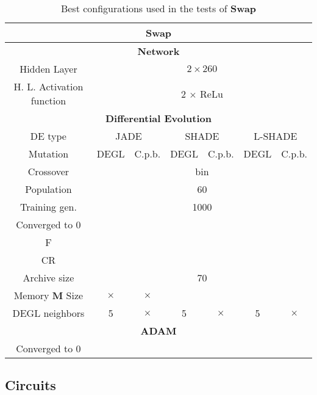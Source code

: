 \begin{table}[!h]
	\centering
	\begin{tabular}{|c|c|c|c|c|c|c|}
		\hline
		\multicolumn{7}{|c|}{\textbf{Swap}} \\ \hline \hline
		\multicolumn{7}{|c|}{\textbf{Network}} \\ \hline
		Hidden Layer & \multicolumn{6}{c|}{$2 \times 260$}\\ \hline
		H. L. Activation function & \multicolumn{6}{c|}{2 $\times$ ReLu}\\ \hline \hline
		\multicolumn{7}{|c|}{\textbf{Differential Evolution}} \\ \hline
		DE type & \multicolumn{2}{c|}{JADE} & \multicolumn{2}{c|}{SHADE} & \multicolumn{2}{c|}{L-SHADE}  \\ \hline
		Mutation & DEGL & C.p.b. & DEGL & C.p.b. & DEGL & C.p.b. \\ \hline
		Crossover & \multicolumn{6}{c|}{bin} \\ \hline
		Population & \multicolumn{6}{c|}{60} \\ \hline
		Training gen. & \multicolumn{6}{c|}{1000} \\ \hline
		Converged to 0 & & & & & & \\ \hline
		F & & & & & &\\ \hline
		CR & & & & & &\\ \hline
		Archive size & \multicolumn{6}{c|}{70} \\ \hline
		Memory \textbf{M} Size & $\times$ & $\times$ & & & &\\ \hline
		DEGL neighbors & 5 & $\times$ & 5 & $\times$ & 5 & $\times$  \\ \hline\hline
		\multicolumn{7}{|c|}{\textbf{ADAM}} \\ \hline
		Converged to 0 & \multicolumn{6}{|c|}{\checkmark} \\ \hline
 	\end{tabular}
	\caption{Best configurations used in the tests of \textbf{Swap}}
	\label{tbl:tests-configurations-swap}
\end{table}

\subsection{Circuits}\label{subsec:circuits}